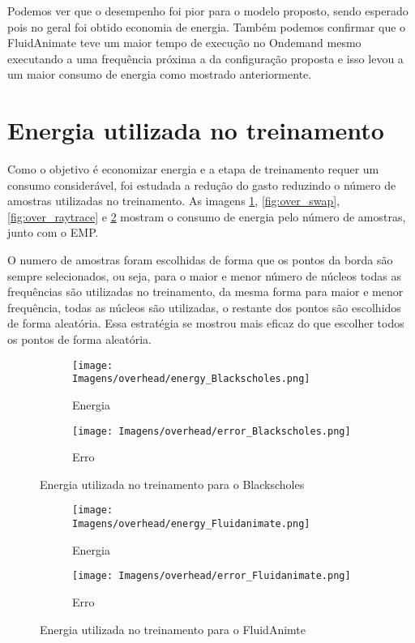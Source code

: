 Podemos ver que o desempenho foi pior para o modelo proposto, sendo esperado pois no geral foi obtido economia de energia. Também podemos confirmar que o FluidAnimate teve um maior tempo de execução no Ondemand mesmo executando a uma frequência próxima a da configuração proposta e isso levou a um maior consumo de energia como mostrado anteriormente.

\section{Energia utilizada no treinamento}

Como o objetivo é economizar energia e a etapa de treinamento requer um consumo considerável, foi estudada a redução do gasto reduzindo o número de amostras utilizadas no treinamento. As imagens \ref{fig:over_black}, \ref{fig:over_swap}, \ref{fig:over_raytrace} e \ref{fig:over_fluid} mostram o consumo de energia pelo número de amostras, junto com o EMP.

O numero de amostras foram escolhidas de forma que os pontos da borda são sempre selecionados, ou seja, para o maior e menor número de núcleos todas as frequências são utilizadas no treinamento, da mesma forma para maior e menor frequência, todas as núcleos são utilizadas, o restante dos pontos são escolhidos de forma aleatória. Essa estratégia se mostrou mais eficaz do que escolher todos os pontos de forma aleatória.

\begin{figure}[H]
	\centering
	\begin{subfigure}[t]{0.48\textwidth}
		\texttt{[image: Imagens/overhead/energy\_Blackscholes.png]}
		\caption{Energia}
	\end{subfigure}\hspace{0.04\textwidth}%
	\begin{subfigure}[t]{0.48\textwidth}
		\texttt{[image: Imagens/overhead/error\_Blackscholes.png]}
		\caption{Erro}
	\end{subfigure}%
	\caption{Energia utilizada no treinamento para o Blackscholes}
	\label{fig:over_black}
\end{figure}

\begin{figure}[H]
	\centering
	\begin{subfigure}[t]{0.48\textwidth}
		\texttt{[image: Imagens/overhead/energy\_Fluidanimate.png]}
		\caption{Energia}
	\end{subfigure}\hspace{0.04\textwidth}%
	\begin{subfigure}[t]{0.48\textwidth}
		\texttt{[image: Imagens/overhead/error\_Fluidanimate.png]}
		\caption{Erro}
	\end{subfigure}%
	\caption{Energia utilizada no treinamento para o FluidAnimte}
	\label{fig:over_fluid}
\end{figure}

